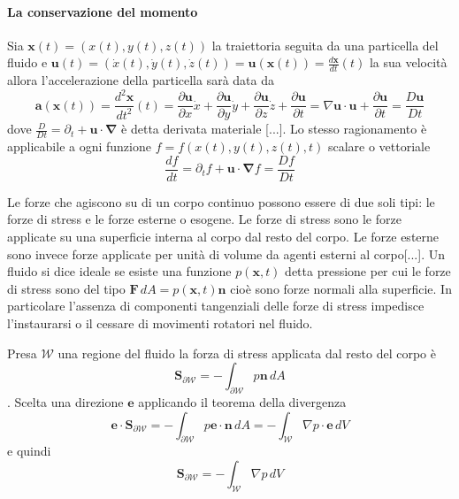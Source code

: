 \documentclass{book}
\newcommand{\Nabla}{\boldsymbol{\nabla}}
\begin{document}
\paragraph{La conservazione del momento}
Sia $\mathbf{x}(t) = (x(t),y(t),z(t))$ la traiettoria seguita da una particella del fluido e $\mathbf{u}(t) = (\dot{x}(t),\dot{y}(t),\dot{z}(t)) = \mathbf{u}(\mathbf{x}(t)) = \frac{d\mathbf{x}}{dt}(t)$ la sua velocità allora l'accelerazione della particella sarà data da
\begin{equation*} 
\mathbf{a}(\mathbf{x}(t)) = \frac{d^2\mathbf{x}}{dt^2} (t) = \frac{\partial  \mathbf{u}}{\partial x}\dot{x} + \frac{\partial  \mathbf{u}}{\partial y}\dot{y} + \frac{\partial  \mathbf{u}}{\partial z}\dot{z} + \frac{\partial \mathbf{u}}{\partial t}
= \nabla  \mathbf{u} \cdot  \mathbf{u} + \frac{\partial \mathbf{u}}{\partial t} = \frac{D \mathbf{u}}{Dt}
\end{equation*}
dove $\frac{D}{Dt}=\partial_t + \mathbf{u}\cdot\Nabla$ è detta derivata materiale [...].
Lo stesso ragionamento è applicabile a ogni funzione $f=f(x(t),y(t),z(t),t)$ scalare o vettoriale
\begin{equation*}
\frac{df}{dt}=\partial_tf+\mathbf{u}\cdot\Nabla f = \frac{Df}{Dt}
\end{equation*}

Le forze che agiscono su di un corpo continuo possono essere di due soli tipi: le forze di stress e le forze esterne o esogene. Le forze di stress sono le forze applicate su una superficie interna al corpo dal resto del corpo. Le forze esterne sono invece forze applicate per unità di volume da agenti esterni al corpo[...]. Un fluido si dice ideale se esiste una funzione $p(\mathbf{x},t)$ detta pressione per cui le forze di stress sono del tipo $\mathbf{F}\,dA = p(\mathbf{x},t)\mathbf{n}$ cioè sono forze normali alla superficie. In particolare l'assenza di componenti tangenziali delle forze di stress impedisce l'instaurarsi o il cessare di movimenti rotatori nel fluido.

Presa $\mathcal{W}$ una regione del fluido la forza di stress applicata dal resto del corpo è
$$\mathbf{S}_{\partial\mathcal{W}} = - \int_{\partial\mathcal{W}} p\mathbf{n}\,dA$$.
Scelta una direzione $\mathbf{e}$ applicando il teorema della divergenza
$$\mathbf{e}\cdot\mathbf{S}_{\partial\mathcal{W}} = - \int_{\partial\mathcal{W}} p\mathbf{e}\cdot\mathbf{n}\,dA
                                                  = - \int_{\mathcal{W}} \nabla p \cdot \mathbf{e} \, dV $$
e quindi
$$\mathbf{S}_{\partial\mathcal{W}} = - \int_{\mathcal{W}} \nabla p \, dV $$
\end{document}
